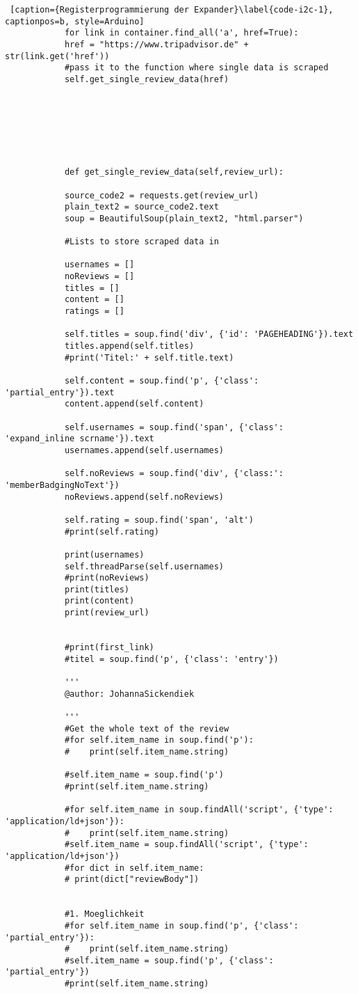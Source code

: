 \documentclass[a4paper,oneside,12pt]{report}
\begin{document}
\begin{lstlisting} [caption={Registerprogrammierung der Expander}\label{code-i2c-1}, captionpos=b, style=Arduino]
			for link in container.find_all('a', href=True):
			href = "https://www.tripadvisor.de" + str(link.get('href'))
			#pass it to the function where single data is scraped
			self.get_single_review_data(href)
			
			
			
			
			
			
			
			def get_single_review_data(self,review_url):
			
			source_code2 = requests.get(review_url)
			plain_text2 = source_code2.text
			soup = BeautifulSoup(plain_text2, "html.parser")
			
			#Lists to store scraped data in
			
			usernames = []
			noReviews = []
			titles = []
			content = []
			ratings = []
			
			self.titles = soup.find('div', {'id': 'PAGEHEADING'}).text
			titles.append(self.titles)
			#print('Titel:' + self.title.text)
			
			self.content = soup.find('p', {'class': 'partial_entry'}).text
			content.append(self.content)
			
			self.usernames = soup.find('span', {'class': 'expand_inline scrname'}).text
			usernames.append(self.usernames)
			
			self.noReviews = soup.find('div', {'class:': 'memberBadgingNoText'})
			noReviews.append(self.noReviews)
			
			self.rating = soup.find('span', 'alt')
			#print(self.rating)
			
			print(usernames)
			self.threadParse(self.usernames)
			#print(noReviews)
			print(titles)
			print(content)
			print(review_url)
			
			
			#print(first_link)
			#titel = soup.find('p', {'class': 'entry'})
			
			'''
			@author: JohannaSickendiek
			
			'''
			#Get the whole text of the review
			#for self.item_name in soup.find('p'):
			#    print(self.item_name.string)
			
			#self.item_name = soup.find('p')
			#print(self.item_name.string)
			
			#for self.item_name in soup.findAll('script', {'type': 'application/ld+json'}):
			#    print(self.item_name.string)
			#self.item_name = soup.findAll('script', {'type': 'application/ld+json'})
			#for dict in self.item_name:
			# print(dict["reviewBody"])
			
			
			#1. Moeglichkeit
			#for self.item_name in soup.find('p', {'class': 'partial_entry'}):
			#    print(self.item_name.string)
			#self.item_name = soup.find('p', {'class': 'partial_entry'})
			#print(self.item_name.string)
			

\end{lstlisting}
\end{document}
